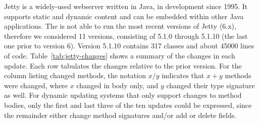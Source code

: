 Jetty is a widely-used webserver written in Java, in development since
1995.  It supports static and dynamic content and can be embedded
within other Java applications.  The \JikesRVM{} is not able to run the
most recent versions of Jetty (6.x), therefore we considered 11
versions, consisting of 5.1.0 through 5.1.10 (the last one prior to
version 6).  Version 5.1.10 contains 317 classes and about 45000 lines
of code.  Table~\ref{tab:jetty-changes} shows a summary of the changes
in each update.  Each row tabulates the changes relative
to the prior version. For the column listing changed methods, the
notation $x/y$ indicates that $x+y$ methods were changed, where $x$
changed in body only, and $y$ changed their type signature as well.
For dynamic updating systems that only support changes to method
bodies, only the first and last three of the ten updates could be
expressed, since the remainder either change method signatures
and/or add or delete fields.


